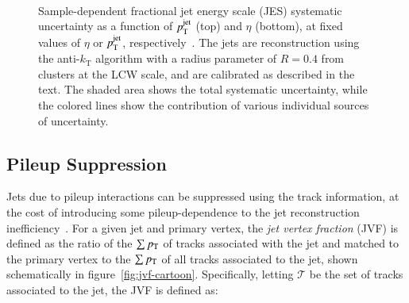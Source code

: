 \begin{figure}[htbp]
{	}
	\hfill
	 \\
	\caption{Sample-dependent fractional jet energy scale (JES) systematic uncertainty as a function of $p_{\text{T}}^{\mathrm{jet}}$ (top) and $\eta$ (bottom), at fixed values of $\eta$ or $p_{\text{T}}^{\mathrm{jet}}$, respectively~\cite{TheATLASCollaboration:2015ds}. The jets are reconstruction using the anti-$k_{\mathrm{T}}$ algorithm with a radius parameter of $R=0.4$ from clusters at the LCW scale, and are calibrated as described in the text. The shaded area shows the total systematic uncertainty, while the colored lines show the contribution of various individual sources of uncertainty.}
	\label{fig:reco-jes-uncertainty}
\end{figure}

\subsection{Pileup Suppression}\label{sec:reco-jets-jvf}
Jets due to pileup interactions can be suppressed using the track information, at the cost of introducing some pileup-dependence to the jet reconstruction inefficiency~\cite{TheATLASCollaboration:2013vb}. For a given jet and primary vertex, the \emph{jet vertex fraction} (JVF) is defined as the ratio of the $\sum p_{\text{T}}$ of tracks associated with the jet and matched to the primary vertex to the $\sum p_{\text{T}}$ of all tracks associated to the jet, shown schematically in figure~\ref{fig:jvf-cartoon}. Specifically, letting $\mathcal{T}$ be the set of tracks associated to the jet, the JVF is defined as:

